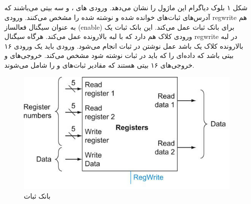 \subsection{}
{شکل ۱ بلوک دیاگرام این ماژول را نشان می‌دهد. ورودی های ،  و  سه بیتی می‌باشند که آدرس‌های ثبات‌های خوانده شده و نوشته شده را مشخص می‌کنند. ورودی regwrite هم به عنوان سیگنال فعالساز (enable) برای بانک ثبات عمل می‌کند. این بانک ثبات یک ورودی کلاک هم دارد که با لبه بالارونده عمل می‌کند. هرگاه سیگنال regwrite در لبه بالارونده کلاک یک باشد عمل نوشتن در ثبات انجام می‌شود. ورودی  باید یک ورودی ۱۶ بیتی باشد که داده‌ای را که باید در ثبات نوشته شود مشخص می‌کند. خروجی‌های  و  خروجی‌های ۱۶ بیتی هستند که مقادیر ثبات‌های  و  را شامل می‌شوند.}\\
\begin{figure}[H]
    \centering
    \includegraphics[width=\textwidth]{images/MIPS_Register_File.jpg}
    \caption{بانک ثبات}
    \label{Register_Bank}
\end{figure}\\

